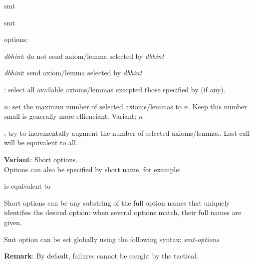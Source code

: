 \begin{tactic}{smt}
\begin{tsyntax}[empty]{smt}
\begin{compactitem}
       options:
           \begin{compactitem}
             \item {}\textit{dbhint}: do not send
               axiom/lemma selected by \textit{dbhint}
             \item {}\textit{dbhint}: send axiom/lemma
               selected by \textit{dbhint}
             \item {}: select all available axioms/lemmas
               execpted those specified by  (if
               any).
             \item {}$n$: set the maximun number of
               selected axioms/lemmas to $n$.  Keep this number small
               is generally more effienciant.  Variant: $n$
             \item {}: try to incrementally augment the
               number of selected axioms/lemmas. Last call will be
               equivalent to all.
           \end{compactitem}
  \end{compactitem}

  \textbf{Variant}: Short options.\\
  Options can also be specified by short name, for example:
  \begin{center}\end{center}
  is equivalent to 
  \begin{center}
  \end{center}
  Short options can be any substring of the full option names that
  uniquely identifies the desired option: when several options match,
  their full names are given.

  Smt option can be set globally using the following syntax:
   \textit{smt-options}

  \textbf{Remark}: By default,  failures cannot be caught by
  the  tactical.
  \end{tsyntax}
\end{tactic}

